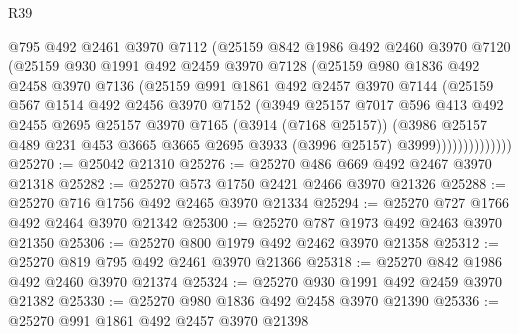 \begin{lexlean}{R39}
\begin{coremodule}
                  @795
                  @492
                  @2461
                  @3970
                  @7112
                  (@25159
                    @842
                    @1986
                    @492
                    @2460
                    @3970
                    @7120
                    (@25159
                      @930
                      @1991
                      @492
                      @2459
                      @3970
                      @7128
                      (@25159
                        @980
                        @1836
                        @492
                        @2458
                        @3970
                        @7136
                        (@25159
                          @991
                          @1861
                          @492
                          @2457
                          @3970
                          @7144
                          (@25159
                            @567
                            @1514
                            @492
                            @2456
                            @3970
                            @7152
                            (@3949
                              @25157
                              @7017
                              @596
                              @413
                              @492
                              @2455
                              @2695
                              @25157
                              @3970
                              @7165
                              (@3914 (@7168 @25157))
                              (@3986
                                @25157
                                @489
                                @231
                                @453
                                @3665
                                @3665
                                @2695
                                @3933
                                (@3996 @25157)
                                @3999))))))))))))))
@25270 := @25042 @21310
@25276 := @25270 @486 @669 @492 @2467 @3970 @21318
@25282 := @25270 @573 @1750 @2421 @2466 @3970 @21326
@25288 := @25270 @716 @1756 @492 @2465 @3970 @21334
@25294 := @25270 @727 @1766 @492 @2464 @3970 @21342
@25300 := @25270 @787 @1973 @492 @2463 @3970 @21350
@25306 := @25270 @800 @1979 @492 @2462 @3970 @21358
@25312 := @25270 @819 @795 @492 @2461 @3970 @21366
@25318 := @25270 @842 @1986 @492 @2460 @3970 @21374
@25324 := @25270 @930 @1991 @492 @2459 @3970 @21382
@25330 := @25270 @980 @1836 @492 @2458 @3970 @21390
@25336 := @25270 @991 @1861 @492 @2457 @3970 @21398

\end{coremodule}
\end{lexlean}

